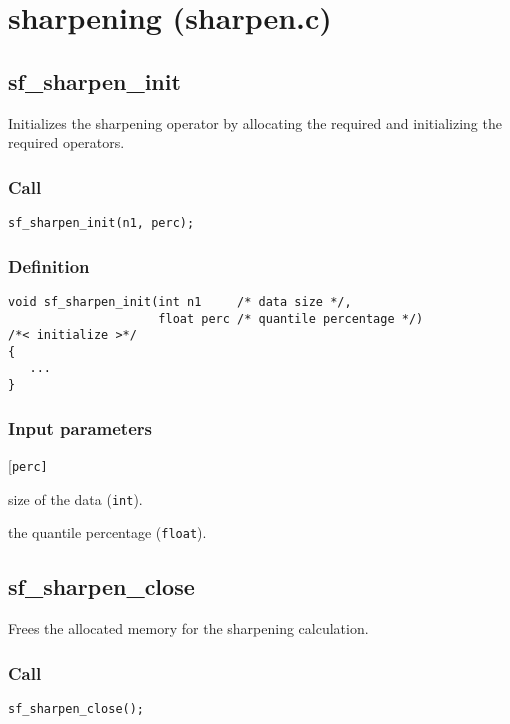 \section{sharpening (sharpen.c)}




\subsection{{sf\_sharpen\_init}}
Initializes the sharpening operator by allocating the required and initializing the required operators.

\subsubsection*{Call}
\begin{verbatim}sf_sharpen_init(n1, perc);\end{verbatim}

\subsubsection*{Definition}
\begin{verbatim}
void sf_sharpen_init(int n1     /* data size */,
                     float perc /* quantile percentage */) 
/*< initialize >*/
{
   ...
}
\end{verbatim}

\subsubsection*{Input parameters}
\begin{desclist}{\tt }{\quad}[\tt perc]
   \setlength\itemsep{0pt}
   \item[n1]	   size  of the data (\texttt{int}).  
   \item[perc] the quantile percentage (\texttt{float}).  
\end{desclist}




\subsection{{sf\_sharpen\_close}}
Frees the allocated memory for the sharpening calculation.

\subsubsection*{Call}
\begin{verbatim}sf_sharpen_close();\end{verbatim}

